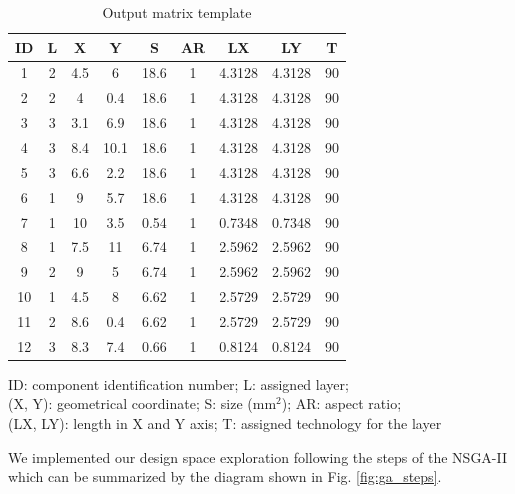 \begin{table}[p]
\caption{Output matrix template}
\begin{center}
\begin{scriptsize}
\begin{tabular}{|c|c|c|c|c|c|c|c|c|}
\hline ID & L & X & Y & S & AR & LX & LY & T\\
\hline 1 & 2 & 4.5 & 6 & 18.6 & 1 & 4.3128 & 4.3128 & 90\\
2 & 2 & 4 & 0.4 & 18.6 & 1 & 4.3128 & 4.3128 & 90\\
3 & 3 & 3.1 & 6.9 & 18.6 & 1 & 4.3128 & 4.3128 & 90\\
4 & 3 & 8.4 & 10.1 & 18.6 & 1 & 4.3128 & 4.3128 & 90\\
5 & 3 & 6.6 & 2.2 & 18.6 & 1 & 4.3128 & 4.3128 & 90\\
6 & 1 & 9 & 5.7 & 18.6 & 1 & 4.3128 & 4.3128 & 90\\
7 & 1 & 10 & 3.5 & 0.54 & 1 & 0.7348 & 0.7348 & 90\\
8 & 1 & 7.5 & 11 & 6.74 & 1 & 2.5962 & 2.5962 & 90\\
9 & 2 & 9 & 5 & 6.74 & 1 & 2.5962 & 2.5962 & 90\\
10 & 1 & 4.5 & 8 & 6.62 & 1 & 2.5729 & 2.5729 & 90\\
11 & 2 & 8.6 & 0.4 & 6.62 & 1 & 2.5729 & 2.5729 & 90\\
12 & 3 & 8.3 & 7.4 & 0.66 & 1 & 0.8124 & 0.8124 & 90\\
\hline
\end{tabular}
\end{scriptsize}
\end{center}
\begin{center}
\begin{scriptsize}
ID: component identification number; L: assigned layer;\\
(X, Y): geometrical coordinate; S: size (mm$^2$); AR: aspect ratio;\\
(LX, LY): length in X and Y axis; T: assigned technology for the layer
\end{scriptsize}
\end{center}
\label{tab:outputmat}
\end{table}

We implemented our design space exploration following the steps of the NSGA-II which can be summarized by the diagram shown in Fig. \ref{fig:ga_steps}.

